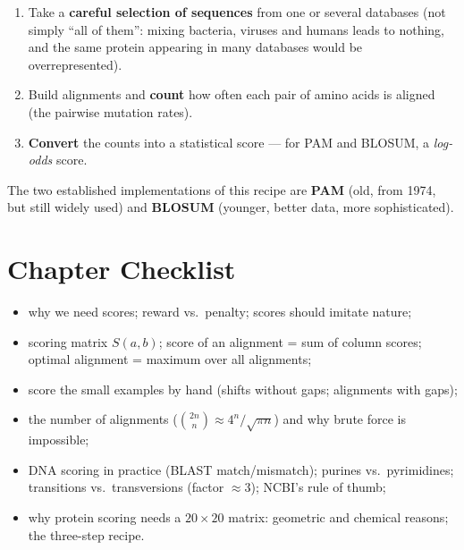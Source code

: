 \documentclass[11pt, oneside]{book}
\let\originalsection\section
\renewcommand{\section}{\Needspace{7\baselineskip}\originalsection}
\begin{document}
\begin{thmbox}[title={Recipe for a protein scoring matrix}]
\begin{enumerate}
  \item Take a \textbf{careful selection of sequences} from one or several
    databases (not simply ``all of them'': mixing bacteria, viruses and
    humans leads to nothing, and the same protein appearing in many databases
    would be overrepresented).
  \item Build alignments and \textbf{count} how often each pair of amino acids
    is aligned (the pairwise mutation rates).
  \item \textbf{Convert} the counts into a statistical score --- for PAM and
    BLOSUM, a \emph{log-odds} score.
\end{enumerate}
The two established implementations of this recipe are \textbf{PAM} (old,
from 1974, but still widely used) and \textbf{BLOSUM} (younger, better data,
more sophisticated).
\end{thmbox}

\section{Chapter Checklist}

\begin{itemize}
  \item why we need scores; reward vs.\ penalty; scores should imitate nature;
  \item scoring matrix $S(a,b)$; score of an alignment = sum of column scores;
    optimal alignment = maximum over all alignments;
  \item score the small examples by hand (shifts without gaps; alignments
    with gaps);
  \item the number of alignments ($\binom{2n}{n} \approx 4^n/\sqrt{\pi n}$) and
    why brute force is impossible;
  \item DNA scoring in practice (BLAST match/mismatch); purines vs.\
    pyrimidines; transitions vs.\ transversions (factor $\approx 3$); NCBI's
    rule of thumb;
  \item why protein scoring needs a $20 \times 20$ matrix: geometric and
    chemical reasons; the three-step recipe.
\end{itemize}

\end{document}
